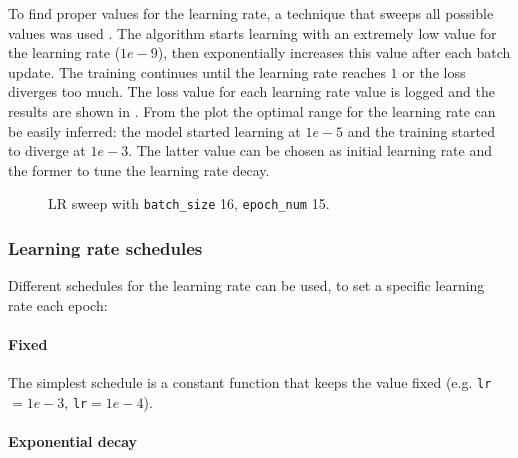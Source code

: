 To find proper values for the learning rate, a technique that sweeps all
possible values was used \cite{PYISlearningsweep}.
The algorithm starts learning with an extremely low value for the learning rate ($1e-9$),
then exponentially increases this value after each batch update. The training
continues until the learning rate reaches $1$ or the loss diverges too much.
The loss value for each learning rate value is logged and the results are shown
in .
From the plot the optimal range for the learning rate can be easily inferred:
the model started learning at $1e-5$ and the training started to diverge at $1e-3$.
The latter value can be chosen as initial learning rate and the former to tune
the learning rate decay.

\begin{figure}[t!]
    \centering
    \caption{LR sweep with \texttt{batch\_size} 16, \texttt{epoch\_num} 15.}%
    \label{fig:LR_sweep_bs16_en15}
\end{figure}

\subsubsection{Learning rate schedules}

Different schedules for the learning rate can be used, to set a specific learning rate each epoch:

\paragraph{Fixed}

The simplest schedule is a constant function that keeps the value fixed
(e.g. \texttt{lr}$=1e-3$, \texttt{lr}$=1e-4$).

\paragraph{Exponential decay}

